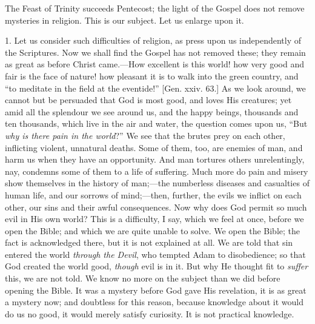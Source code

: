 The Feast of Trinity succeeds Pentecost; the light of
the Gospel does not remove mysteries in religion. This is
our subject. Let us enlarge upon it.

1. Let us consider such difficulties of religion, as
press upon us independently of the Scriptures. Now we
shall find the Gospel has not removed these; they remain
as great as before Christ came.—How excellent is
this world! how very good and fair is the face of nature!
how pleasant it is to walk into the green country, and
``to meditate in the field at the eventide!''
[Gen. xxiv. 63.] As we look around, we cannot but be
persuaded that God is most good, and loves His creatures;
yet amid all the splendour we see around us, and the
happy beings, thousands and ten thousands, which live in
the air and water, the question comes upon us, ``But \emph{why
is there pain in the world}?'' We see that the
brutes prey on each other, inflicting violent, unnatural
deaths. Some of them, too, are enemies of man, and harm
us when they have an opportunity. And man tortures others
unrelentingly, nay, condemns some of them to a life of
suffering. Much more do pain and misery show themselves
in the history of man;—the numberless diseases and
casualties of human life, and our sorrows of
mind;—then, further, the evils we inflict on each
other, our sins and their awful consequences. Now why
does God permit so much evil in His own world? This is a
difficulty, I say, which we feel at once, before we open
the Bible; and which we are quite unable to solve. We
open the Bible; the fact is acknowledged there, but it is
not explained at all. We are told that sin entered the
world \emph{through the Devil}, who tempted Adam to
disobedience; so that God created the world good, \emph{though}
evil is in it. But why He thought fit to \emph{suffer}
this, we are not told. We know no more on the subject
than we did before opening the Bible. It was a mystery
before God gave His revelation, it is as great a mystery
now; and doubtless for this reason, because knowledge
about it would do us no good, it would merely satisfy
curiosity. It is not practical knowledge.

